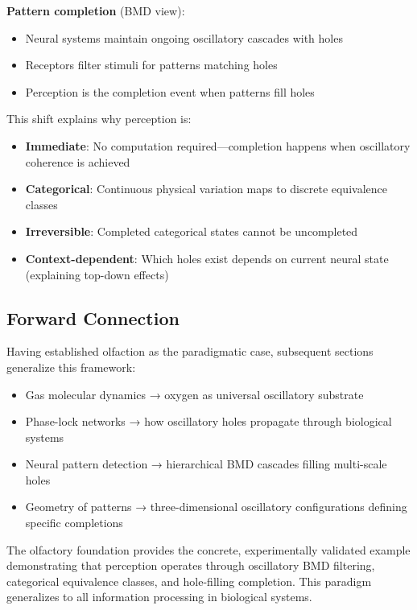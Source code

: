 \documentclass[11pt]{article}
\theoremstyle{remark}
\begin{document}
\textbf{Pattern completion} (BMD view):
\begin{itemize}
\item Neural systems maintain ongoing oscillatory cascades with holes
\item Receptors filter stimuli for patterns matching holes
\item Perception is the completion event when patterns fill holes
\end{itemize}

This shift explains why perception is:
\begin{itemize}
\item \textbf{Immediate}: No computation required—completion happens when oscillatory coherence is achieved
\item \textbf{Categorical}: Continuous physical variation maps to discrete equivalence classes
\item \textbf{Irreversible}: Completed categorical states cannot be uncompleted
\item \textbf{Context-dependent}: Which holes exist depends on current neural state (explaining top-down effects)
\end{itemize}

\subsection{Forward Connection}

Having established olfaction as the paradigmatic case, subsequent sections generalize this framework:
\begin{itemize}
\item Gas molecular dynamics → oxygen as universal oscillatory substrate
\item Phase-lock networks → how oscillatory holes propagate through biological systems
\item Neural pattern detection → hierarchical BMD cascades filling multi-scale holes
\item Geometry of patterns → three-dimensional oscillatory configurations defining specific completions
\end{itemize}

The olfactory foundation provides the concrete, experimentally validated example demonstrating that perception operates through oscillatory BMD filtering, categorical equivalence classes, and hole-filling completion. This paradigm generalizes to all information processing in biological systems.
\end{document}
